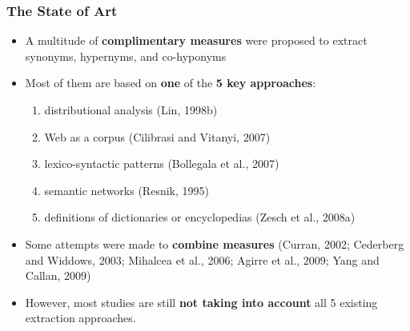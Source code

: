 \documentclass{beamer}
\begin{document}
\begin{frame}
\frametitle{The State of Art}
\begin{itemize}
\item A multitude of \textbf{complimentary measures} were proposed to extract synonyms, hypernyms,
and co-hyponyms

\item Most of them are based on \textbf{one} of the \textbf{5 key approaches}: 
\begin{enumerate}
\item distributional analysis (Lin, 1998b)
\item Web as a corpus (Cilibrasi and Vitanyi, 2007)
\item lexico-syntactic patterns (Bollegala et al., 2007)
\item semantic networks (Resnik, 1995)
\item definitions of dictionaries or encyclopedias (Zesch et al., 2008a)
\end{enumerate}

\pause


\item Some attempts were made to \textbf{combine measures} (Curran, 2002; Cederberg and Widdows, 2003; Mihalcea et al., 2006;
Agirre et al., 2009; Yang and Callan, 2009)


\item However, most studies are still \textbf{not taking into account}
all 5 existing extraction approaches.

\end{itemize}

\end{frame}
\end{document}
